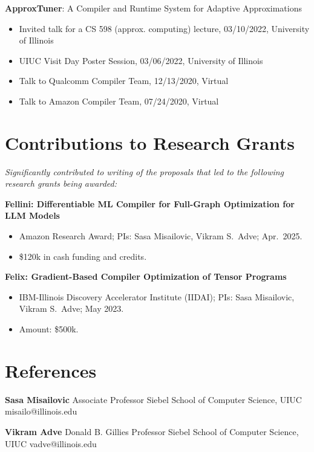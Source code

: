 \documentclass[11pt]{article}
\begin{document}
\textbf{ApproxTuner}: A Compiler and Runtime System for Adaptive Approximations
\begin{itemize}
  \item Invited talk for a CS 598 (approx. computing) lecture, 03/10/2022, University of Illinois
  \item UIUC Visit Day Poster Session, 03/06/2022, University of Illinois
  \item Talk to Qualcomm Compiler Team, 12/13/2020, Virtual
  \item Talk to Amazon Compiler Team, 07/24/2020, Virtual
\end{itemize}

\section{Contributions to Research Grants}
\textit{Significantly contributed to writing of the proposals
that led to the following research grants being awarded:}

\textbf{Fellini: Differentiable ML Compiler for Full-Graph Optimization for LLM Models}
\begin{itemize}
  \item Amazon Research Award; PIs: Sasa Misailovic, Vikram S.~Adve; Apr.~2025.
  \item \$120k in cash funding and credits.
\end{itemize}

\textbf{Felix: Gradient-Based Compiler Optimization of Tensor Programs}
\begin{itemize}
  \item IBM-Illinois Discovery Accelerator Institute (IIDAI); PIs: Sasa Misailovic,
    Vikram S.~Adve; May 2023.
  \item Amount: \$500k.
\end{itemize}

\section{References}
\vspace{0.5em}
\begin{minipage}[t]{0.5\textwidth}
  \textbf{Sasa Misailovic} \newline{}
  Associate Professor \newline{}
  Siebel School of Computer Science, UIUC \newline{}
  misailo@illinois.edu
\end{minipage}
\begin{minipage}[t]{0.5\textwidth}
  \textbf{Vikram Adve} \newline{}
  Donald B. Gillies Professor \newline{}
  Siebel School of Computer Science, UIUC \newline{}
  vadve@illinois.edu
\end{minipage}
\end{document}
